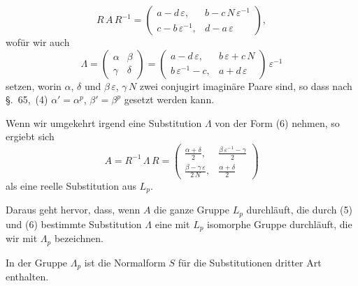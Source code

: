 \documentclass[12pt,a4paper]{article}
\begin{document}
\begin{equation}\label{eq:69.5}
\tag{5}
R\,A\,R^{-1} =
\begin{pmatrix}
a - d\,\varepsilon,& b - c\,N\,\varepsilon^{-1}\\
c - b\,\varepsilon^{-1},& d - a\,\varepsilon
\end{pmatrix},
\end{equation}
wofür wir auch
\begin{equation}\label{eq:69.6}
\tag{6}
\varLambda =
\begin{pmatrix}\alpha&\beta\\\gamma&\delta\end{pmatrix}
= \begin{pmatrix}
a - d\,\varepsilon,& b\,\varepsilon + c\,N\\
b\,\varepsilon^{-1} - c,& a + d\,\varepsilon
\end{pmatrix}\,\varepsilon^{-1}
\end{equation}
setzen, worin $\alpha$, $\delta$ und $\beta\,\varepsilon$, $\gamma\,N$ zwei conjugirt imaginäre Paare sind, so dass nach \S.~65,~(4) $\alpha' = \alpha^{p}$, $\beta' = \beta^{p}$ gesetzt werden kann.

Wenn wir umgekehrt irgend eine Substitution $\varLambda$ von der Form (6) nehmen, so ergiebt sich
\[
A = R^{-1}\,\varLambda\,R =
\begin{pmatrix}
\frac{\alpha + \delta}{2},&
\frac{\beta\,\varepsilon^{-1} - \gamma}{2}\\[4pt]
\frac{\beta - \gamma\,\varepsilon}{2\,N},&
\frac{\alpha + \delta}{2}
\end{pmatrix}
\]
als eine reelle Substitution aus $L_{p}$.

Daraus geht hervor, dass, wenn $A$ die ganze Gruppe $L_{p}$ durchläuft, die durch (5) und (6) bestimmte Substitution $\varLambda$ eine mit $L_{p}$ isomorphe Gruppe durchläuft, die wir mit $\varLambda_{p}$ bezeichnen.

\newpage
{}

In der Gruppe $\varLambda_{p}$ ist die Normalform $S$ für die Substitutionen dritter Art enthalten.
\end{document}
